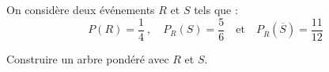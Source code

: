 \begin{exo}
	On considère deux événements $R$ et $S$ tels que :
	\[
		P(R) = \dfrac{1}{4}\ ,\quad P_{R}(S) = \dfrac{5}{6}\quad\text{et}\quad P_{\overline{R}}\left(\overline{S}\right) = \dfrac{11}{12}
	\]

	Construire un arbre pondéré avec $R$ et $S$.
\end{exo}
